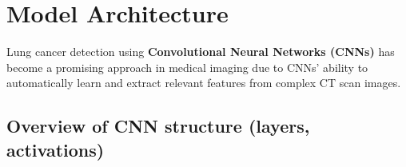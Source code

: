 \section{Model Architecture}

Lung cancer detection using \textbf{Convolutional Neural Networks (CNNs)} has become a promising 
approach in medical imaging due to CNNs’ ability to automatically learn and extract relevant 
features from complex CT scan images.


\subsection{Overview of CNN structure (layers, activations)}

